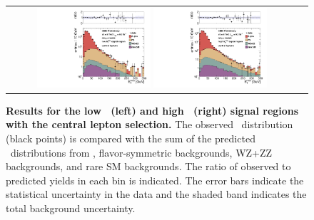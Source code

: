 \begin{figure}[!h]
\begin{center}
\begin{tabular}{cc}
\includegraphics[width=0.4\textwidth]{plots/edge_pfmet_pt40_lowMet_central_all.pdf}
\includegraphics[width=0.4\textwidth]{plots/edge_pfmet_pt40_highMet_central_all.pdf}
\end{tabular}
\caption{\footnotesize {\bf Results for the low \MET\ (left) and high \MET\ (right) signal regions with the central lepton selection.}
The observed \MET\ distribution (black points) is compared with the sum of the predicted \MET\
distributions from \zjets, flavor-symmetric backgrounds, WZ+ZZ backgrounds, and rare SM backgrounds. 
The ratio of observed to predicted yields in each bin is
indicated. The error bars indicate the statistical uncertainty in the data and the shaded band indicates the total background uncertainty.
\label{fig:results_central}
}
\end{center}
\end{figure}

